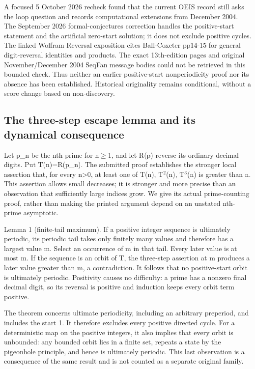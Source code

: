 \documentclass[11pt,a4paper]{article}
\begin{document}
A focused 5 October 2026 recheck found that the current OEIS record still asks the loop question and records computational extensions from December 2004. The September 2026 formal-conjectures correction handles the positive-start statement and the artificial zero-start solution; it does not exclude positive cycles. The linked Wolfram Reversal exposition cites Ball-Coxeter pp14-15 for general digit-reversal identities and products. The exact 13th-edition pages and original November/December 2004 SeqFan message bodies could not be retrieved in this bounded check. Thus neither an earlier positive-start nonperiodicity proof nor its absence has been established. Historical originality remains conditional, without a score change based on non-discovery.

\subsection{The three-step escape lemma and its dynamical consequence}
Let p\_n be the nth prime for n\ensuremath{\geq}1, and let R(p) reverse its ordinary decimal digits. Put T(n)=R(p\_n). The submitted proof establishes the stronger local assertion that, for every n>0, at least one of T(n), T\ensuremath{^2}(n), T\ensuremath{^3}(n) is greater than n. This assertion allows small decreases; it is stronger and more precise than an observation that sufficiently large indices grow. We give its actual prime-counting proof, rather than making the printed argument depend on an unstated nth-prime asymptotic.

Lemma 1 (finite-tail maximum). If a positive integer sequence is ultimately periodic, its periodic tail takes only finitely many values and therefore has a largest value m. Select an occurrence of m in that tail. Every later value is at most m. If the sequence is an orbit of T, the three-step assertion at m produces a later value greater than m, a contradiction. It follows that no positive-start orbit is ultimately periodic. Positivity causes no difficulty: a prime has a nonzero final decimal digit, so its reversal is positive and induction keeps every orbit term positive.

The theorem concerns ultimate periodicity, including an arbitrary preperiod, and includes the start 1. It therefore excludes every positive directed cycle. For a deterministic map on the positive integers, it also implies that every orbit is unbounded: any bounded orbit lies in a finite set, repeats a state by the pigeonhole principle, and hence is ultimately periodic. This last observation is a consequence of the same result and is not counted as a separate original family.
\end{document}

